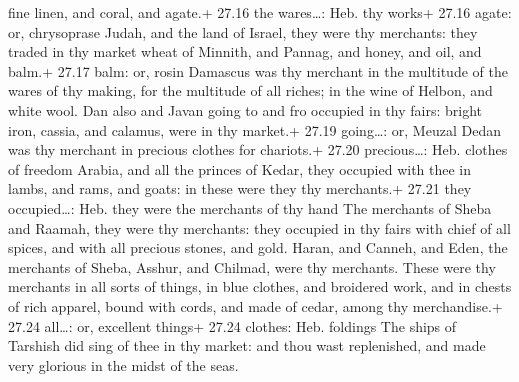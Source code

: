 fine linen, and coral, and agate.+ 27.16 the wares\ldots: Heb. thy
works+ 27.16 agate: or, chrysoprase  Judah, and the land of
Israel, they were thy merchants: they traded in thy market wheat of
Minnith, and Pannag, and honey, and oil, and balm.+ 27.17 balm: or,
rosin  Damascus was thy merchant in the multitude of the
wares of thy making, for the multitude of all riches; in the wine of
Helbon, and white wool.  Dan also and Javan going to and
fro occupied in thy fairs: bright iron, cassia, and calamus, were in thy
market.+ 27.19 going\ldots: or, Meuzal  Dedan was thy
merchant in precious clothes for chariots.+ 27.20 precious\ldots: Heb.
clothes of freedom  Arabia, and all the princes of Kedar,
they occupied with thee in lambs, and rams, and goats: in these were
they thy merchants.+ 27.21 they occupied\ldots: Heb. they were the
merchants of thy hand  The merchants of Sheba and Raamah,
they were thy merchants: they occupied in thy fairs with chief of all
spices, and with all precious stones, and gold.  Haran, and
Canneh, and Eden, the merchants of Sheba, Asshur, and Chilmad, were thy
merchants.  These were thy merchants in all sorts of
things, in blue clothes, and broidered work, and in chests of rich
apparel, bound with cords, and made of cedar, among thy merchandise.+
27.24 all\ldots: or, excellent things+ 27.24 clothes: Heb. foldings
 The ships of Tarshish did sing of thee in thy market: and
thou wast replenished, and made very glorious in the midst of the seas.


